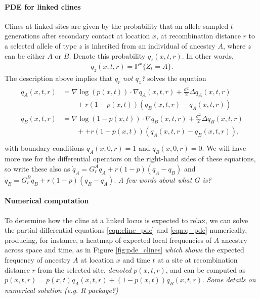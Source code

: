 \documentclass[12pt]{article}
\newcommand{\alisa}[1]{{\em \color{red} #1}}
\renewcommand{\P}{\mathbb{P}}
\newcommand{\grad}{\nabla}
\begin{document}
\paragraph{PDE for linked clines}
Clines at linked sites are given by
the probability that 
an allele sampled $t$ generations after secondary contact at location $x$,
at recombination distance $r$ to a selected allele of type $z$
is inherited from an individual of ancestry $A$,
where $z$ can be either $A$ or $B$.
Denote this probability $q_z(x,t,r)$.
In other words,
\begin{align}
    q_z(x,t,r) = \P^x \{Z_t = A\} .
\end{align}
The description above implies that $q_r$ \alisa{not $q_z$?} solves the equation
\begin{align}
    \begin{aligned}  \label{eqn:q_pde}
    \dot q_A(x,t,r) 
            &= \grad \log(p(x,t)) \cdot \grad q_A(x,t,r) 
                + \frac{\sigma^2}{2} \Delta q_A(x,t,r) 
            \\ &\qquad {} + 
                r (1-p(x,t))(q_B(x,t,r)-q_A(x,t,r))  \\
    \dot q_B(x,t,r) &= \grad \log(1-p(x,t)) \cdot \grad q_B(x,t,r) 
            + \frac{\sigma^2}{2} \Delta q_B(x,t,r)
            \\ &\qquad {} + 
            + r (1-p(x,t))(q_A(x,t,r)-q_B(x,t,r))  ,
    \end{aligned} \\
\end{align}
with boundary conditions $q_A(x,0,r)=1$ and $q_B(x,0,r)=0$.
We will have more use for the differential operators on the right-hand sides of these equations,
so write these also as 
$\dot q_A = G_r^A q_A + r (1-p) (q_A-q_B)$
and 
$\dot q_B = G_r^B q_B + r (1-p) (q_B-q_A)$.
\alisa{A few words about what $G$ is?}


\paragraph{Numerical computation}
To determine how the cline at a linked locus is expected to relax,
we can solve the partial differential equations \eqref{eqn:cline_pde} and \eqref{eqn:q_pde} numerically,
producing, for instance, a heatmap of expected local frequencies of $A$ ancestry
across space and time, as in Figure \ref{fig:pde_clines} \alisa{which shows}
 the expected frequency of ancestry $A$ at location $x$ and time $t$ at a site at recombination distance $r$ from the selected site,
\alisa{denoted} $p(x,t,r)$, and can be computed as $p(x,t,r) = p(x,t) q_A(x,t,r) + (1-p(x,t)) q_B(x,t,r)$. \alisa{Some details on numerical solution (e.g. R package?)}
\end{document}
